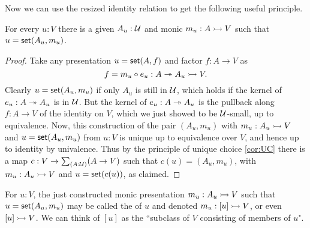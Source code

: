 Now we can use the resized identity relation to get the following useful principle.

\begin{lem}\label{lem:MonicSetPresent}
For every $u:V$ there is a given $A_u:\mathcal{U}$ and monic $m_u: A \rightarrowtail V$ such that $u = \mathsf{set}(A_u, m_u)$.
\end{lem}

\begin{proof}
  Take any presentation $u = \mathsf{set}(A,f)$ and factor $f:A\to V$ as
  \begin{equation*}
    f = m_u\circ e_u : A \twoheadrightarrow A_u \rightarrowtail V.    
  \end{equation*}
  Clearly $u = \mathsf{set}(A_u, m_u)$ if only $A_u$ is still in $\mathcal{U}$, which holds if the kernel of $e_u : A \twoheadrightarrow A_u$ is in $\mathcal{U}$.  But the kernel of $e_u : A \twoheadrightarrow A_u$ is the pullback along $f : A\to V$ of the identity on $V$, which we just showed to be $\mathcal{U}$-small, up to equivalence.  Now, this construction of the pair $(A_u, m_u)$ with $m_u :A_u \rightarrowtail V$ and $u = \mathsf{set}(A_u, m_u)$ from $u:V$ is unique up to equivalence over $V$, and hence up to identity by univalence.  Thus by the principle of unique choice \eqref{cor:UC} there is a map $c : V\to\sm{A:\UU}(A\to V)$ such that $c(u) = (A_u, m_u)$, with $m_u :A_u \rightarrowtail V$ and $u = \mathsf{set}(c(u))$, as claimed.
\end{proof}

\begin{defn}\label{def:TypeOfElements}
For $u:V$, the just constructed monic presentation $m_u: A_u \rightarrowtail V$ such that $u = \mathsf{set}(A_u, m_u)$ may be called the  of $u$ and denoted $m_u : [u] \rightarrowtail V$, or even $[u] \rightarrowtail V$.  We can think of $[u]$ as the ``subclass of $V$ consisting of members of $u$".
\end{defn}

